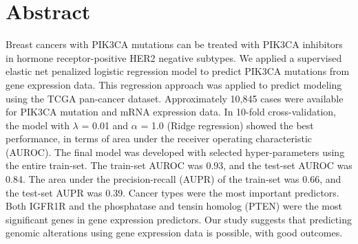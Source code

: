 \documentclass[10pt,letterpaper]{article}
\newcommand{\getIndex}[2]{
  \ForEach{,}{\IfEq{#1}{\thislevelitem}{\number\thislevelcount\ExitForEach}{}}{#2}
}
\newcommand{\getAff}[1]{
  \getIndex{#1}{Department of Hospital Pathology, Seoul St.~Mary's Hospital}
}
\begin{document}
\vspace*{0.2in}

\section*{Abstract}
Breast cancers with PIK3CA mutations can be treated with PIK3CA
inhibitors in hormone receptor-positive HER2 negative subtypes. We
applied a supervised elastic net penalized logistic regression model to
predict PIK3CA mutations from gene expression data. This regression
approach was applied to predict modeling using the TCGA pan-cancer
dataset. Approximately 10,845 cases were available for PIK3CA mutation
and mRNA expression data. In 10-fold cross-validation, the model with
\(\lambda\) = 0.01 and \(\alpha\) = 1.0 (Ridge regression) showed the
best performance, in terms of area under the receiver operating
characteristic (AUROC). The final model was developed with selected
hyper-parameters using the entire train-set. The train-set AUROC was
0.93, and the test-set AUROC was 0.84. The area under the
precision-recall (AUPR) of the train-set was 0.66, and the test-set AUPR
was 0.39. Cancer types were the most important predictors. Both IGFR1R
and the phosphatase and tensin homolog (PTEN) were the most significant
genes in gene expression predictors. Our study suggests that predicting
genomic alterations using gene expression data is possible, with good
outcomes.
\end{document}
